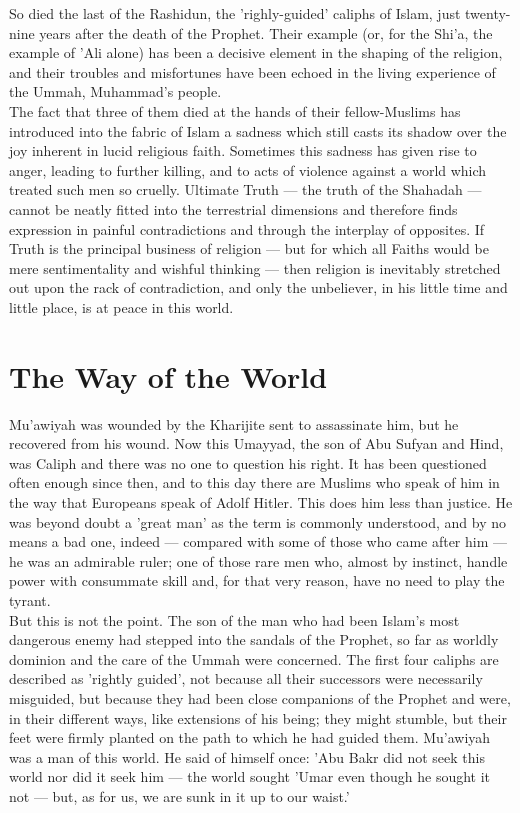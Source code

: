 \documentclass[11pt, b5paper, twoside]{book}
\begin{document}
So died the last of the Rashidun, the 'righly-guided' caliphs of Islam, just twenty-nine years after the death of the Prophet. Their example (or, for the Shi'a, the example of 'Ali alone) has been a decisive element in the shaping of the religion, and their troubles and misfortunes have been echoed in the living experience of the Ummah, Muhammad's people. \\

The fact that three of them died at the hands of their fellow-Muslims has introduced into the fabric of Islam a sadness which still casts its shadow over the joy inherent in lucid religious faith. Sometimes this sadness has given rise to anger, leading to further killing, and to acts of violence against a world which treated such men so cruelly. Ultimate Truth --- the truth of the Shahadah --- cannot be neatly fitted into the terrestrial dimensions and therefore finds expression in painful contradictions and through the interplay of opposites. If Truth is the principal business of religion --- but for which all Faiths would be mere sentimentality and wishful thinking --- then religion is inevitably stretched out upon the rack of contradiction, and only the unbeliever, in his little time and little place, is at peace in this world. \\


\chapter{The Way of the World}

Mu'awiyah was wounded by the Kharijite sent to assassinate him, but he recovered from his wound. Now 
this Umayyad, the son of Abu Sufyan and Hind, was Caliph and there was no one to question his right. 
It has been questioned often enough since then, and to this day there are Muslims who speak of him in 
the way that Europeans speak of Adolf Hitler. This does him less than justice. He was beyond doubt a 
'great man' as the term is commonly understood, and by no means a bad one, indeed --- compared with 
some of those who came after him --- he was an admirable ruler; one of those rare men who, almost by 
instinct, handle power with consummate skill and, for that very reason, have no need to play the 
tyrant. \\

But this is not the point. The son of the man who had been Islam's most dangerous enemy had stepped 
into the sandals of the Prophet, so far as worldly dominion and the care of the Ummah were concerned. 
The first four caliphs are described as 'rightly guided', not because all their successors were 
necessarily misguided, but because they had been close companions of the Prophet and were, in their 
different ways, like extensions of his being; they might stumble, but their feet were firmly planted 
on the path to which he had guided them. Mu'awiyah was a man of this world. He said of himself once: 
'Abu Bakr did not seek this world nor did it seek him --- the world sought 'Umar even though he sought 
it not --- but, as for us, we are sunk in it up to our waist.' \\
\end{document}
